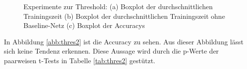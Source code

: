  \begin{figure}
     \centering
     \hfill
     \caption{Experimente zur Threshold: (a) Boxplot der durchschnittlichen Trainingszeit (b) Boxplot der durchschnittlichen Trainingszeit ohne Baseline-Netz (c) Boxplot der Accuracys}
     \label{abb:thres}
\end{figure}
In Abbildung \ref{abb:thres2} ist die Accuracy zu sehen. Aus dieser Abbildung lässt sich keine Tendenz erkennen. Diese Aussage wird durch die p-Werte der paarweisen t-Tests in Tabelle \ref{tab:thres2} gestützt.
